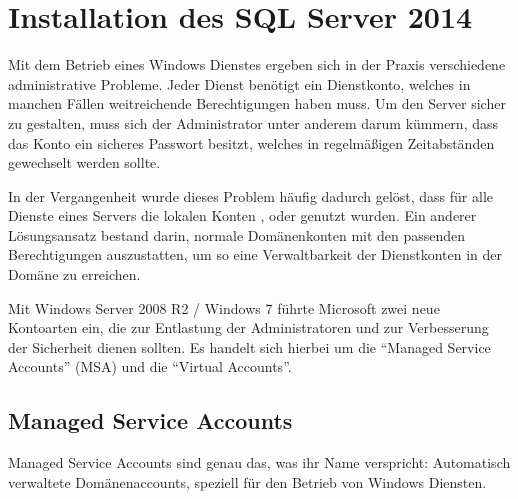   \chapter{Installation des SQL Server 2014}
  \label{installation_of_sql_server_2014}
  \chaptertoc{}
  \cleardoubleevenpage
    Mit dem Betrieb eines Windows Dienstes ergeben sich in der Praxis verschiedene
    administrative Probleme. Jeder Dienst benötigt ein Dienstkonto, welches in
    manchen Fällen weitreichende Berechtigungen haben muss. Um den Server sicher
    zu gestalten, muss sich der Administrator unter anderem darum kümmern, dass
    das Konto ein sicheres Passwort besitzt, welches in regelmäßigen Zeitabständen
    gewechselt werden sollte.
    
    In der Vergangenheit wurde dieses Problem häufig dadurch gelöst, dass für alle
    Dienste eines Servers die lokalen Konten ,
     oder  genutzt wurden. Ein
    anderer Lösungsansatz bestand darin, normale Domänenkonten mit den passenden
    Berechtigungen auszustatten, um so eine Verwaltbarkeit der Dienstkonten in der
    Domäne zu erreichen.
    
    Mit Windows Server 2008 R2 / Windows 7 führte Microsoft zwei neue Kontoarten
    ein, die zur Entlastung der Administratoren und zur Verbesserung der
    Sicherheit dienen sollten. Es handelt sich hierbei um die \enquote{Managed
    Service Accounts} (MSA) und die \enquote{Virtual Accounts}.
    \section{Managed Service Accounts}
      Managed Service Accounts sind genau das, was ihr Name verspricht:
      Automatisch verwaltete Domänenaccounts, speziell für den Betrieb von
      Windows Diensten.
